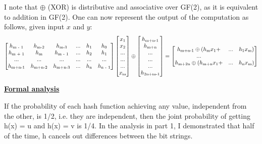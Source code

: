 \documentclass[11pt]{article}
\begin{document}
\begin{flushleft}
I note that $\oplus$ (XOR) is distributive and associative over GF(2), as it is equivalent to addition in GF(2).
One can now represent the output of the computation as follows, given input $x$ and $y$:
 \hspace*{-10cm}
\[
  \begin{bmatrix}
  h\textsubscript{m - 1} & h\textsubscript{m-2} & h\textsubscript{m-3} & ... & h\textsubscript{1} & h\textsubscript{0} \\
  h\textsubscript{m + 1} & h\textsubscript{m} & h\textsubscript{m - 1} & ... & h\textsubscript{2} & h\textsubscript{1} \\
  ... & ... & ... & ... & ... & ... \\
  h\textsubscript{m+n-1} & h\textsubscript{m+n-2} & h\textsubscript{m+n-3} & ... & h\textsubscript{n} & h\textsubscript{n - 1}
  \end{bmatrix}
   \begin{bmatrix}
  x\textsubscript{1} \\ x\textsubscript{2} \\ ... \\ ... \\ ... \\ x\textsubscript{m} 
  \end{bmatrix}
  \oplus
  \begin{bmatrix}
  h\textsubscript{m+n-1} \\ h\textsubscript{m+n} \\ ... \\ ... \\ ... \\ h\textsubscript{2n+m-1} 
  \end{bmatrix}
  =
  \begin{bmatrix}
  h\textsubscript{m+n-1} \oplus ( h\textsubscript{m}x\textsubscript{1} + & ... & h\textsubscript{1}x\textsubscript{m}) \\
  ... \\
  h\textsubscript{m+2n} \oplus ( h\textsubscript{m+n}x\textsubscript{1} + & ... & h\textsubscript{n}x\textsubscript{m}) \\
  \end{bmatrix}
\]

\begin{center}
\end{center}

\textbf{\underline{Formal analysis}}

If the probability of each hash function achieving any value, independent from the other, is 1/2, i.e. they are independent, then the joint probability of getting h(x) = u and h(x) = v is 1/4. In the analysis in part 1,  I demonstrated that half of the time, h cancels out differences between the bit strings.


\end{flushleft}
\end{document}
